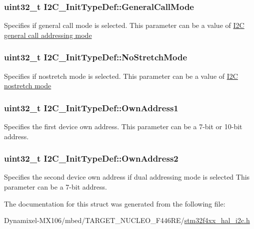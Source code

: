 \subsubsection[{\texorpdfstring{General\+Call\+Mode}{GeneralCallMode}}]{\setlength{\rightskip}{0pt plus 5cm}uint32\+\_\+t I2\+C\+\_\+\+Init\+Type\+Def\+::\+General\+Call\+Mode}\hypertarget{struct_i2_c___init_type_def_a17ce92b135a4b5c045a5387c91677803}{}\label{struct_i2_c___init_type_def_a17ce92b135a4b5c045a5387c91677803}
Specifies if general call mode is selected. This parameter can be a value of \hyperlink{group___i2_c__general__call__addressing__mode}{I2C general call addressing mode} 
\subsubsection[{\texorpdfstring{No\+Stretch\+Mode}{NoStretchMode}}]{\setlength{\rightskip}{0pt plus 5cm}uint32\+\_\+t I2\+C\+\_\+\+Init\+Type\+Def\+::\+No\+Stretch\+Mode}\hypertarget{struct_i2_c___init_type_def_a28afdce458703464638f1a01e04da04e}{}\label{struct_i2_c___init_type_def_a28afdce458703464638f1a01e04da04e}
Specifies if nostretch mode is selected. This parameter can be a value of \hyperlink{group___i2_c__nostretch__mode}{I2C nostretch mode} 
\subsubsection[{\texorpdfstring{Own\+Address1}{OwnAddress1}}]{\setlength{\rightskip}{0pt plus 5cm}uint32\+\_\+t I2\+C\+\_\+\+Init\+Type\+Def\+::\+Own\+Address1}\hypertarget{struct_i2_c___init_type_def_abfb610317ea08e85c8feece82ccc9e16}{}\label{struct_i2_c___init_type_def_abfb610317ea08e85c8feece82ccc9e16}
Specifies the first device own address. This parameter can be a 7-\/bit or 10-\/bit address. 
\subsubsection[{\texorpdfstring{Own\+Address2}{OwnAddress2}}]{\setlength{\rightskip}{0pt plus 5cm}uint32\+\_\+t I2\+C\+\_\+\+Init\+Type\+Def\+::\+Own\+Address2}\hypertarget{struct_i2_c___init_type_def_a8165caf61b7b52f903edd7517ddaa06b}{}\label{struct_i2_c___init_type_def_a8165caf61b7b52f903edd7517ddaa06b}
Specifies the second device own address if dual addressing mode is selected This parameter can be a 7-\/bit address. 

The documentation for this struct was generated from the following file\+:\begin{DoxyCompactItemize}
\item 
Dynamixel-\/\+M\+X106/mbed/\+T\+A\+R\+G\+E\+T\+\_\+\+N\+U\+C\+L\+E\+O\+\_\+\+F446\+R\+E/\hyperlink{stm32f4xx__hal__i2c_8h}{stm32f4xx\+\_\+hal\+\_\+i2c.\+h}\end{DoxyCompactItemize}
